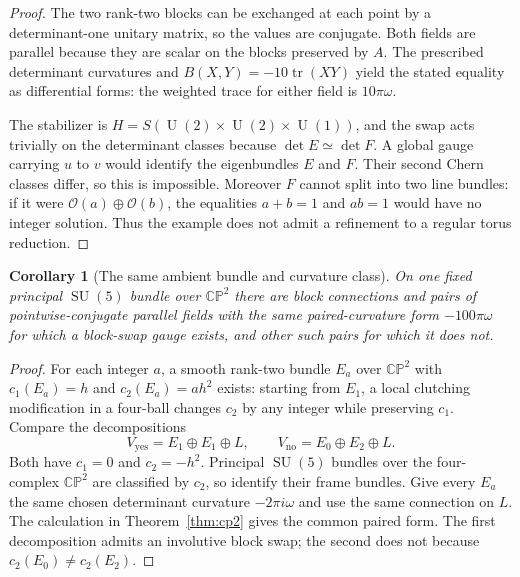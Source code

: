 \documentclass[11pt]{amsart}
\newcommand{\SU}{\operatorname{SU}}
\newcommand{\U}{\operatorname{U}}
\theoremstyle{plain}
\newtheorem{corollary}[theorem]{Corollary}
\theoremstyle{definition}
\theoremstyle{remark}
\begin{document}
\begin{proof}
The two rank-two blocks can be exchanged at each point by a determinant-one unitary matrix, so the values are conjugate. Both fields are parallel because they are scalar on the blocks preserved by $A$. The prescribed determinant curvatures and $B(X,Y)=-10\operatorname{tr}(XY)$ yield the stated equality as differential forms: the weighted trace for either field is $10\pi\omega$.

The stabilizer is $H=S(\U(2)\times\U(2)\times\U(1))$, and the swap acts trivially on the determinant classes because $\det E\simeq\det F$. A global gauge carrying $u$ to $v$ would identify the eigenbundles $E$ and $F$. Their second Chern classes differ, so this is impossible. Moreover $F$ cannot split into two line bundles: if it were $\mathcal O(a)\oplus\mathcal O(b)$, the equalities $a+b=1$ and $ab=1$ would have no integer solution. Thus the example does not admit a refinement to a regular torus reduction.
\end{proof}

\begin{corollary}[The same ambient bundle and curvature class]\label{cor:sameP}
On one fixed principal $\SU(5)$ bundle over $\mathbb{CP}^2$ there are block connections and pairs of pointwise-conjugate parallel fields with the same paired-curvature form $-100\pi\omega$ for which a block-swap gauge exists, and other such pairs for which it does not.
\end{corollary}

\begin{proof}
For each integer $a$, a smooth rank-two bundle $E_a$ over $\mathbb{CP}^2$ with $c_1(E_a)=h$ and $c_2(E_a)=a h^2$ exists: starting from $E_1$, a local clutching modification in a four-ball changes $c_2$ by any integer while preserving $c_1$. Compare the decompositions
\[
 V_{\mathrm{yes}}=E_1\oplus E_1\oplus L,
 \qquad V_{\mathrm{no}}=E_0\oplus E_2\oplus L.
\]
Both have $c_1=0$ and $c_2=-h^2$. Principal $\SU(5)$ bundles over the four-complex $\mathbb{CP}^2$ are classified by $c_2$, so identify their frame bundles. Give every $E_a$ the same chosen determinant curvature $-2\pi i\omega$ and use the same connection on $L$. The calculation in Theorem~\ref{thm:cp2} gives the common paired form. The first decomposition admits an involutive block swap; the second does not because $c_2(E_0)\ne c_2(E_2)$.
\end{proof}
\end{document}
